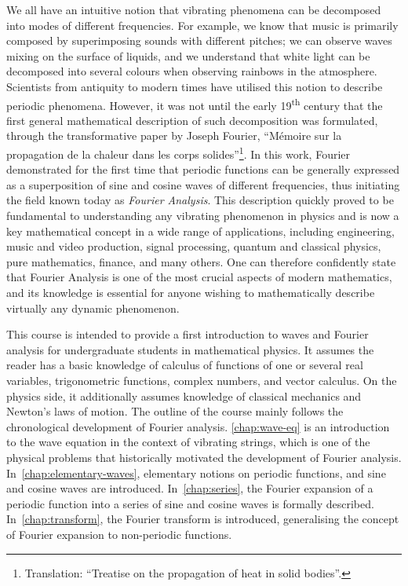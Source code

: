 We all have an intuitive notion that vibrating phenomena can be decomposed into modes of
different frequencies. For example, we know that music is primarily composed by
superimposing sounds with different pitches; we can observe waves mixing on the surface of
liquids, and we understand that white light can be decomposed into several colours when
observing rainbows in the atmosphere. Scientists from antiquity to modern times have
utilised this notion to describe periodic phenomena. However, it was not until the early
19\textsuperscript{th} century that the first general mathematical description of such
decomposition was formulated, through the transformative paper by Joseph Fourier,
``Mémoire sur la propagation de la chaleur dans les corps solides''\footnote{Translation:
``Treatise on the propagation of heat in solid bodies''.}. In this work, Fourier
demonstrated for the first time that periodic functions can be generally expressed as a
superposition of sine and cosine waves of different frequencies, thus initiating the field
known today as \emph{Fourier Analysis}. This description quickly proved to be fundamental
to understanding any vibrating phenomenon in physics and is now a key mathematical concept
in a wide range of applications, including engineering, music and video production, signal
processing, quantum and classical physics, pure mathematics, finance, and many others. One
can therefore confidently state that Fourier Analysis is one of the most crucial aspects
of modern mathematics, and its knowledge is essential for anyone wishing to mathematically
describe virtually any dynamic phenomenon.

This course is intended to provide a first introduction to waves and Fourier analysis for
undergraduate students in mathematical physics. It assumes the reader has a basic
knowledge of calculus of functions of one or several real variables, trigonometric
functions, complex numbers, and vector calculus. On the physics side, it additionally
assumes knowledge of classical mechanics and Newton's laws of motion. The outline of the
course mainly follows the chronological development of Fourier analysis.
\cref{chap:wave-eq} is an introduction to the wave equation in the context of vibrating
strings, which is one of the physical problems that historically motivated the development
of Fourier analysis. In~\cref{chap:elementary-waves}, elementary notions on periodic
functions, and sine and cosine waves are introduced. In~\cref{chap:series}, the Fourier
expansion of a periodic function into a series of sine and cosine waves is formally
described. In~\cref{chap:transform}, the Fourier transform is introduced, generalising the
concept of Fourier expansion to non-periodic functions.